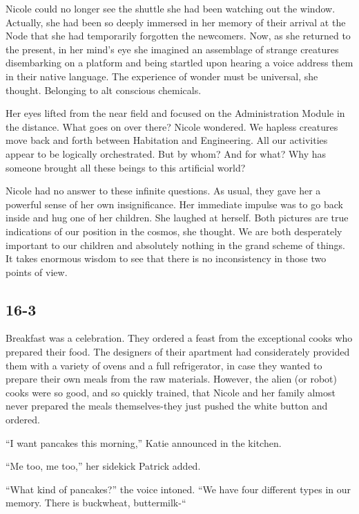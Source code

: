 \documentclass[]{article}
\begin{document}
{Nicole could no longer see the shuttle she had been watching out the window.  Actually, she had been so deeply immersed in her memory of their arrival at the Node that she had temporarily forgotten the newcomers.  Now, as she returned to the present, in her mind’s eye she imagined an assemblage of strange creatures disembarking on a platform and being startled upon hearing a voice address them in their native language.  The experience of wonder must be universal, she thought.  Belonging to alt conscious chemicals.

Her eyes lifted from the near field and focused on the Administration Module in the distance.  What goes on over there? Nicole wondered.  We hapless creatures move back and forth between Habitation and Engineering.  All our activities appear to be logically orchestrated.  But by whom? And for what? Why has someone brought all these beings to this artificial world?

Nicole had no answer to these infinite questions.  As usual, they gave her a powerful sense of her own insignificance.  Her immediate impulse was to go back inside and hug one of her children.  She laughed at herself.  Both pictures are true indications of our position in the cosmos, she thought.  We are both desperately important to our children and absolutely nothing in the grand scheme of things.  It takes enormous wisdom to see that there is no inconsistency in those two points of view.

\subsection*{16-3}

Breakfast was a celebration.  They ordered a feast from the exceptional cooks who prepared their food.  The designers of their apartment had considerately provided them with a variety of ovens and a full refrigerator, in case they wanted to prepare their own meals from the raw materials.  However, the alien (or robot) cooks were so good, and so quickly trained, that Nicole and her family almost never prepared the meals themselves-they just pushed the white button and ordered.

“I want pancakes this morning,” Katie announced in the kitchen.

“Me too, me too,” her sidekick Patrick added.

“What kind of pancakes?” the voice intoned.  “We have four different types in our memory.  There is buckwheat, buttermilk-“

}
\end{document}
